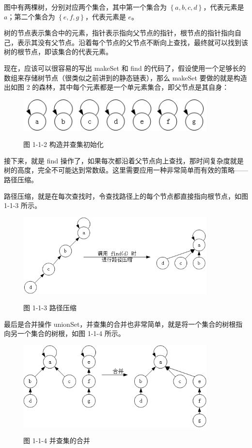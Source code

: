 \documentclass[12pt]{article}  %
\begin{document}
图中有两棵树，分别对应两个集合，其中第一个集合为 $\left\{ a, b, c, d \right\}$，代表元素是 $a$；第二个集合为 $\left\{ e, f, g \right\}$，代表元素是 $e$。

树的节点表示集合中的元素，指针表示指向父节点的指针，根节点的指针指向自己，表示其没有父节点。沿着每个节点的父节点不断向上查找，最终就可以找到该树的根节点，即该集合的代表元素。

现在，应该可以很容易的写出 makeSet 和 find 的代码了，假设使用一个足够长的数组来存储树节点（很类似之前讲到的静态链表），那么 makeSet 要做的就是构造出如图 2 的森林，其中每个元素都是一个单元素集合，即父节点是其自身：

\begin{figure}[h]
\centering
\includegraphics[width = 10cm ]{1-1-2.png}

图 1-1-2 构造并查集初始化
\end{figure}

接下来，就是 find 操作了，如果每次都沿着父节点向上查找，那时间复杂度就是树的高度，完全不可能达到常数级。这里需要应用一种非常简单而有效的策略——路径压缩。

路径压缩，就是在每次查找时，令查找路径上的每个节点都直接指向根节点，如图 1-1-3 所示。

\begin{figure}[h]
\centering
\includegraphics[width = 10cm ]{1-1-3.png}

图 1-1-3 路径压缩
\end{figure}

最后是合并操作 unionSet，并查集的合并也非常简单，就是将一个集合的树根指向另一个集合的树根，如图 1-1-4 所示。

\begin{figure}[h]
\centering
\includegraphics[width = 10cm ]{1-1-4.png}

图 1-1-4 并查集的合并
\end{figure}
\end{document}
